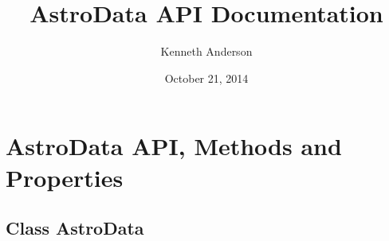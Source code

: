 \documentclass[letterpaper,10pt,english]{sphinxmanual}
\title{AstroData API Documentation}
\date{October 21, 2014}
\author{Kenneth Anderson}
\begin{document}
\maketitle
\tableofcontents
{}\label{index::doc}



\chapter{AstroData API, Methods and Properties}
\label{astro_class:astrodata-api-documentation}\label{astro_class:astrodata-api-methods-and-properties}\label{astro_class::doc}

\section{Class AstroData}
\label{astro_class:class-astrodata}\label{astro_class:module-astrodata.AstroData}
\end{document}
